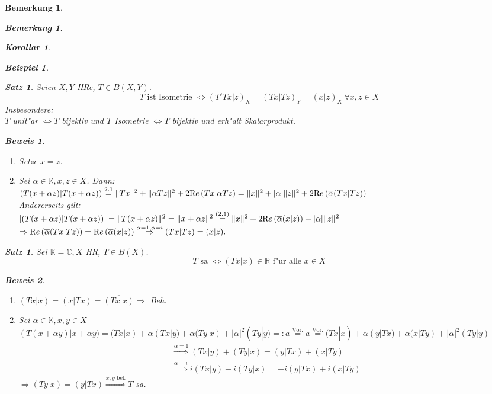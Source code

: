 \documentclass[a4paper,11pt]{book}
\newcommand{\R}{{\mathbb R}}
\newcommand{\C}{{\mathbb C}}
\newcommand{\K}{{\mathbb K}}
\newcommand{\re}{\ensuremath{\text Re}\,} %
\newtheorem{Sa}[Def]{Satz}
\newtheorem{Kor}[Def]{Korollar}
\newtheorem*{BspNO}{Beispiel}
\newtheorem*{BemNO}{Bemerkung}
\newtheorem{Bem}[Def]{Bemerkung}
\theoremstyle{nonumberplain}
\newtheorem{Bew}{Beweis}
\begin{document}
\begin{Bem}
\begin{BemNO}
\begin{Kor}
\begin{BspNO}
\begin{enumerate}
\begin{Sa}
Seien $X,Y$ HRe, $T \in B(X,Y).$
\[
T \text{ ist Isometrie } \Longleftrightarrow (T'Tx|z)_X = (Tx|Tz)_Y = (x|z)_X \ \forall x,z \in X
\]
Insbesondere:\\
$T$ unit"ar $\Leftrightarrow T$ bijektiv und $T$ Isometrie $\Leftrightarrow T$ bijektiv und erh"alt Skalarprodukt.
\end{Sa}

\begin{Bew}\\
\begin{enumerate}
\item["` $\Leftarrow$ "'] Setze $x = z$.

\item["` $\Rightarrow$ "'] Sei $\alpha \in \K, x,z \in X$. Dann:\\
$(T(x+\alpha z)|T(x+\alpha z)) \stackrel{2.1}{=} \|Tx\|^2 + \|\alpha Tz\|^2 + 2 \re (Tx|\alpha Tz) = \|x\|^2 + |\alpha| \|z\|^2 + 2 \re (\overline{\alpha}(Tx|Tz))$\\
Andererseits gilt:\\
$|(T(x+\alpha z)|T(x+\alpha z))| = \|T(x+\alpha z)\|^2 = \|x+\alpha z\|^2 \stackrel{(2.1)}{=} \|x\|^2 + 2 \re (\overline{\alpha}(x|z)) + |\alpha| \|z\|^2$\\
$\Rightarrow \re(\overline{\alpha}(Tx|Tz)) = \re(\overline{\alpha}(x|z)) \stackrel{\alpha=1,\alpha=i}{\Rightarrow} (Tx|Tz) = (x|z).$
\end{enumerate}
\end{Bew}


\begin{Sa}
Sei $\K = \C, X$ HR, $T \in B(X)$.
\[
T \text{ sa } \Leftrightarrow (Tx|x) \in \R \text{ f"ur alle } x \in X
\]
\end{Sa}

\begin{Bew}\\
\begin{enumerate}
\item["` $\Rightarrow$ "'] $(Tx|x) = (x|Tx) = \overline{(Tx|x)} \Rightarrow$ Beh.

\item["` $\Leftarrow$ "'] Sei $\alpha \in \K, x,y \in X$\\
$(T(x+\alpha y)|x+\alpha y) = (Tx|x) + \overline{\alpha} (Tx|y) + \alpha (Ty|x) + |\alpha|^2(Ty|y) =: a \stackrel{\text{Vor.}}{=} \overline{a} \stackrel{\text{Vor.}}{=} (Tx|x) + \alpha(y|Tx) + \overline{\alpha}(x|Ty) + |\alpha|^2(Ty|y)$
\begin{eqnarray}
\stackrel{\alpha = 1}{\Rightarrow} (Tx|y) + (Ty|x) = (y|Tx) + (x|Ty) \\
\stackrel{\alpha = i}{\Rightarrow} i(Tx|y) - i(Ty|x) = -i(y|Tx) + i(x|Ty)
\end{eqnarray}
$\Rightarrow (Ty|x) = (y|Tx) \stackrel{x,y \text{ bel.}}{\Rightarrow} T$ sa.
\end{enumerate}
\end{Bew}



\end{enumerate}
\end{BspNO}
\end{Kor}
\end{BemNO}
\end{Bem}
\end{document}
